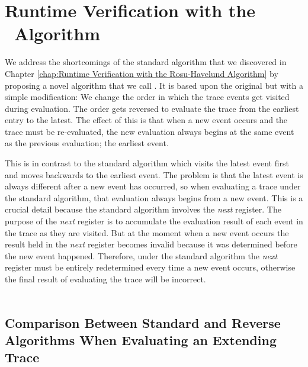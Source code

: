\chapter{Runtime Verification with the \RRH\ Algorithm}
\label{chap:Reverse Rosu-Havelund Algorithm}

We address the shortcomings of the standard algorithm that we discovered in Chapter \ref{chap:Runtime Verification with the Rosu-Havelund Algorithm} by proposing a novel algorithm that we call \RRH.  It is based upon the original but with a simple modification: We change the order in which the trace events get visited during evaluation.  The order gets reversed to evaluate the trace from the earliest entry to the latest.  The effect of this is that when a new event occurs and the trace must be re-evaluated, the new evaluation always begins at the same event as the previous evaluation; the earliest event.


This is in contrast to the standard algorithm which visits the latest event first and moves backwards to the earliest event.  The problem is that the latest event is always different after a new event has occurred, so when evaluating a trace under the standard algorithm, that evaluation always begins from a new event.  This is a crucial detail because the standard algorithm involves the \textit{next} register.  The purpose of the \textit{next} register is to accumulate the evaluation result of each event in the trace as they are visited.  But at the moment when a new event occurs the result held in the \textit{next} register becomes invalid because it was determined before the new event happened.  Therefore, under the standard algorithm the \textit{next} register must be entirely redetermined every time a new event occurs, otherwise the final result of evaluating the trace will be incorrect.\\
\\
\section{Comparison Between Standard and Reverse Algorithms When Evaluating an Extending Trace}

